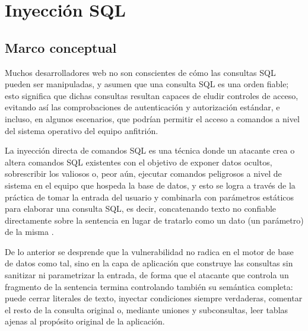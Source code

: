 \section{Inyección SQL}
\subsection{Marco conceptual}

Muchos desarrolladores web no son conscientes de cómo las consultas SQL pueden ser manipuladas, y asumen que una consulta SQL es una orden fiable; esto significa que dichas consultas resultan capaces de eludir controles de acceso, evitando así las comprobaciones de autenticación y autorización estándar, e incluso, en algunos escenarios, que podrían permitir el acceso a comandos a nivel del sistema operativo del equipo anfitrión.

La inyección directa de comandos SQL es una técnica donde un atacante crea o altera comandos SQL existentes con el objetivo de exponer datos ocultos, sobrescribir los valiosos o, peor aún, ejecutar comandos peligrosos a nivel de sistema en el equipo que hospeda la base de datos, y esto se logra a través de la práctica de tomar la entrada del usuario y combinarla con parámetros estáticos para elaborar una consulta SQL, es decir, concatenando texto no confiable directamente sobre la sentencia en lugar de tratarlo como un dato (un parámetro) de la misma \cite{owasp-sqli}.

De lo anterior se desprende que la vulnerabilidad no radica en el motor de base de datos como tal, sino en la capa de aplicación que construye las consultas sin sanitizar ni parametrizar la entrada, de forma que el atacante que controla un fragmento de la sentencia termina controlando también su semántica completa: puede cerrar literales de texto, inyectar condiciones siempre verdaderas, comentar el resto de la consulta original o, mediante uniones y subconsultas, leer tablas ajenas al propósito original de la aplicación.
